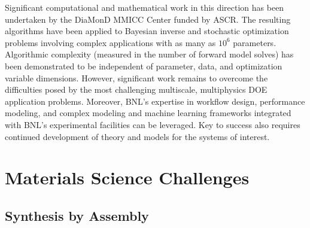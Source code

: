 \documentclass[11pt]{article}
\begin{document}
Significant computational and mathematical work in this direction has
been undertaken by the DiaMonD MMICC Center funded by ASCR. The
resulting algorithms have been applied to Bayesian inverse and
stochastic optimization problems involving complex applications with
as many as $10^6$ parameters.  Algorithmic complexity (measured in the
number of forward model solves) has been demonstrated to be
independent of parameter, data, and optimization variable dimensions.
However, significant work remains to overcome the difficulties posed
by the most challenging multiscale, multiphysics DOE application
problems.  Moreover, BNL's expertise in workflow design, performance
modeling, and complex modeling and machine learning frameworks
integrated with BNL's experimental facilities can be leveraged.  Key
to success also requires continued development of theory and models
for the systems of interest.

\section{Materials Science Challenges}

\subsection{Synthesis by Assembly}
\end{document}
